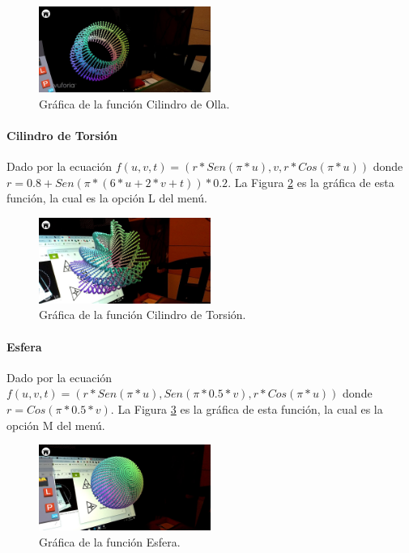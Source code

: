\begin{figure}[hbt!]
\centering
\includegraphics[width=0.5\textwidth]{figuras/graficas/cilindro_olla.png}
\caption{\label{fig:graf_cilindro_olla}Gráfica de la función Cilindro de Olla.}
\end{figure}
\FloatBarrier

\paragraph{Cilindro de Torsión}
Dado por la ecuación $f(u,v,t)=(r*Sen(\pi * u), v, r*Cos(\pi * u))$ donde $r = 0.8 + Sen(\pi * (6 * u + 2 * v + t)) * 0.2$. La Figura \ref{fig:graf_cilindro_torsion} es la gráfica de esta función, la cual es la opción L del menú.

\begin{figure}[hbt!]
\centering
\includegraphics[width=0.5\textwidth]{figuras/graficas/cilindro_torsion.png}
\caption{\label{fig:graf_cilindro_torsion}Gráfica de la función Cilindro de Torsión.}
\end{figure}
\FloatBarrier

\paragraph{Esfera}
Dado por la ecuación $f(u,v,t)=(r*Sen(\pi * u), Sen(\pi * 0.5 * v), r*Cos(\pi * u))$ donde $r = Cos(\pi * 0.5 * v)$. La Figura \ref{fig:graf_esfera} es la gráfica de esta función, la cual es la opción M del menú.

\begin{figure}[hbt!]
\centering
\includegraphics[width=0.5\textwidth]{figuras/graficas/esfera.png}
\caption{\label{fig:graf_esfera}Gráfica de la función Esfera.}
\end{figure}
\FloatBarrier

